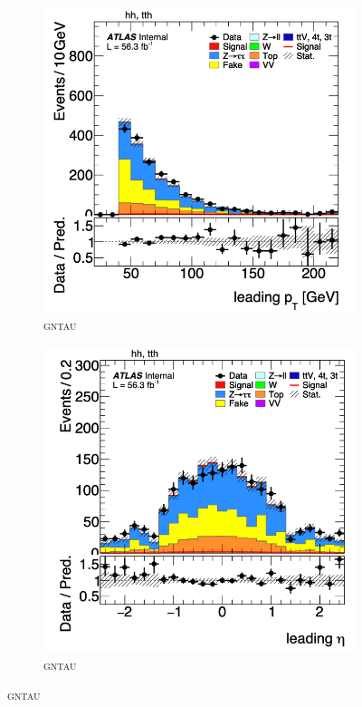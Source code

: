   \begin{figure}[htbp]
    \centering
    \begin{subfigure}[b]{0.45\textwidth}
        \centering
        \includegraphics[width=\textwidth]{images/leading_pt_gntau.png}
        \caption{\textsc{gntau}}
    \end{subfigure}
    \begin{subfigure}[b]{0.45\textwidth}
        \centering
        \includegraphics[width=\textwidth]{images/leading_eta_gntau.png}
        \caption{\textsc{gntau}}
    \end{subfigure}


\end{figure}
